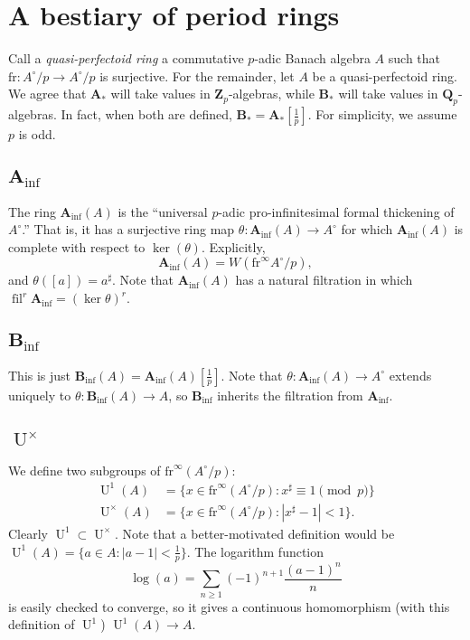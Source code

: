 \documentclass{article}
\DeclareMathOperator{\filtration}{fil}
\newcommand{\dQ}{\mathbf{Q}}
\newcommand{\dZ}{\mathbf{Z}}
\newcommand{\frobenius}{\mathrm{fr}}
\newcommand{\Ainf}{\mathbf{A}_\mathrm{inf}}
\newcommand{\Binf}{\mathbf{B}_\mathrm{inf}}
\DeclareMathOperator{\units}{U}
\begin{document}
\section{A bestiary of period rings}

Call a \emph{quasi-perfectoid ring} a commutative $p$-adic Banach algebra 
$A$ such that $\frobenius:A^\circ/p\to A^\circ/p$ is surjective. For the 
remainder, let $A$ be a quasi-perfectoid ring. We agree that 
$\mathbf{A}_\ast$ will take values in $\dZ_p$-algebras, while 
$\mathbf{B}_\ast$ will take values in $\dQ_p$-algebras. In fact, when both are 
defined, $\mathbf{B}_\ast=\mathbf{A}_\ast[\frac 1 p]$. For simplicity, we 
assume $p$ is odd. 


\subsection{\texorpdfstring{$\Ainf$}{Ainf}}

The ring $\Ainf(A)$ is the ``universal $p$-adic pro-infinitesimal formal 
thickening of $A^\circ$.'' That is, it has a surjective ring map 
$\theta:\Ainf(A)\to A^\circ$ for which $\Ainf(A)$ is complete with respect to 
$\ker(\theta)$. Explicitly, 
\[
  \Ainf(A) = W(\frobenius^\infty A^\circ/p) ,
\]
and $\theta([a]) = a^\sharp$. Note that $\Ainf(A)$ has a natural filtration 
in which $\filtration^r \Ainf = (\ker\theta)^r$. 


\subsection{\texorpdfstring{$\Binf$}{Binf}}

This is just $\Binf(A) = \Ainf(A)[\frac 1 p]$. Note that 
$\theta:\Ainf(A)\to A^\circ$ extends uniquely to 
$\theta:\Binf(A)\to A$, so $\Binf$ inherits the filtration from 
$\Ainf$. 


\subsection{\texorpdfstring{$\units^\times$}{Ux}}

We define two subgroups of $\frobenius^\infty(A^\circ/p)$:
\begin{align*}
  \units^1(A) 
    &= \{x\in \frobenius^\infty(A^\circ/p):x^\sharp\equiv 1\pmod p\} \\
  \units^\times(A) 
    &= \{x\in \frobenius^\infty(A^\circ/p):|x^\sharp-1|<1\} .
\end{align*}
Clearly $\units^1\subset \units^\times$. Note that a better-motivated definition 
would be $\units^1(A)=\{a\in A:|a-1|<\frac 1 p\}$. The logarithm function 
\[
  \log(a) = \sum_{n\geqslant 1} (-1)^{n+1} \frac{(a-1)^n}{n}
\]
is easily checked to converge, so it gives a continuous homomorphism (with this 
definition of $\units^1$) $\units^1(A)\to A$. 
\end{document}
